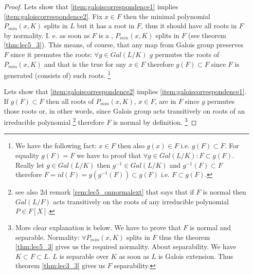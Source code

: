 \begin{theorem}
\begin{proof}
    Lets show that \ref{item:galoiscorrespondence1} implies
    \ref{item:galoiscorrespondence2}. Fix $x \in F$ then the minimal
    polynomial $P_{min}\left(x, K\right)$ splits in $L$ but it has a
    root in $F$, thus it should have all roots in $F$ by normality.
    I. e. as soon as $F$ is a ,
    $P_{min}\left(x, K\right)$ splits in $F$ (see theorem
    \ref{thm:lec5_3}). This means, of course, 
    that any map from Galois group preserves $F$ since it premutes the
    roots: $\forall g \in Gal\left(L/K\right)$ $g$ permutes the roots
    of $P_{min}\left(x, K\right)$ and that is the true for any $x \in
    F$ therefore $g\left(F\right) \subset F$ since $F$ is generated
    (consists of) such roots.
    \footnote{
      We have the following fact: $x \in F$ then also $g(x) \in F$
      i.e. $g(F) \subset F$. For equality $g\left(F\right) = F$ we
      have to proof that $\forall g \in Gal\left(L/K\right): F \subset
      g\left(F\right)$. Really let $g \in Gal\left(L/K\right)$ then
      $g^{-1} \in Gal\left(L/K\right)$ and
      $g^{-1}(F) \subset F$ therefore $F = id(F) =
      g\left(g^{-1}(F)\right) \subset 
      g(F)$ i.e. $F \subset g(F)$.  
    }

    Lets show that \ref{item:galoiscorrespondence2} implies
    \ref{item:galoiscorrespondence1}. If $g\left(F\right) \subset F$
    then all roots of $P_{min}\left(x, K\right)$, $x \in F$, are in $F$
    since $g$ permutes those roots or, in other words, since Galois
    group acts transitively on
    roots of an irreducible polynomial
    \footnote{
      see also 2d remark \ref{rem:lec5_onnormalext} that says that if
      $F$ is normal then $Gal(L/F)$ acts
      transitively on the roots of any irreducible polynomial $P \in
      F\left[X\right]$. 
    }
    therefore $F$ is normal by
    definition.
    \footnote{
      More clear explanation is below. We have to prove that $F$ is
      normal and separable. Normality: $\forall P_{min}\left(x,
      K\right)$ splits in $F$ thus the theorem \ref{thm:lec5_3} gives
      us the required normality. About separability. We have $K
      \subset F \subset L$. $L$ is separable over $K$ as soon as $L$
      is Galois extension. Thus theorem \ref{thm:lec3_3} gives us $F$
      separability. 
    }


\end{proof}
\end{theorem}

